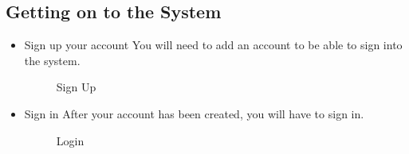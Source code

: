 \subsection{Getting on to the System}
\begin{itemize}
	\item{Sign up your account}
	\newline
	You will need to add an account to be able to sign into the system.
	\begin{figure}[H]
	    	\centering
	    	\caption{Sign Up}
	    	\label{fig:Learning rate 0.1}
   	\end{figure}
	\item{Sign in}
	\newline
	After your account has been created, you will have to sign in.
	\begin{figure}[H]
	    	\centering
	    	\caption{Login}
	    	\label{fig:Learning rate 0.1}
   	\end{figure}
\end{itemize}
